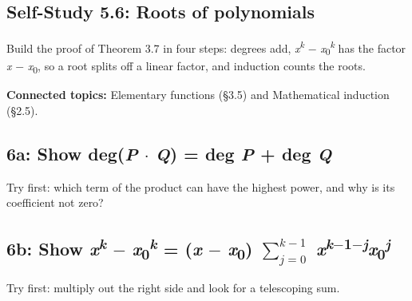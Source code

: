 \documentclass[11pt]{article}
\begin{document}
\begin{keepsection}
\section{Self-Study 5.6: Roots of polynomials}

Build the proof of Theorem 3.7 in four steps: degrees add, \textit{x}\textsuperscript{\textit{k}} \ensuremath{-} \textit{x}\textsubscript{0}\textsuperscript{\textit{k}} has the factor \textit{x} \ensuremath{-} \textit{x}\textsubscript{0}, so a root splits off a linear factor, and induction counts the roots.

\textbf{Connected topics:} Elementary functions (§3.5) and Mathematical induction (§2.5).

\begin{keepsection}
\subsection{6a: Show deg(\textit{P} \ensuremath{\cdot} \textit{Q}) = deg \textit{P} + deg \textit{Q}}

Try first: which term of the product can have the highest power, and why is its coefficient not zero?

\end{keepsection}

\begin{keepsection}
\subsection{6b: Show \textit{x}\textsuperscript{\textit{k}} \ensuremath{-} \textit{x}\textsubscript{0}\textsuperscript{\textit{k}} = (\textit{x} \ensuremath{-} \textit{x}\textsubscript{0}) $\sum_{{j}=0}^{{k}-1} $ \textit{x}\textsuperscript{\textit{k}\ensuremath{-}1\ensuremath{-}\textit{j}}\textit{x}\textsubscript{0}\textsuperscript{\textit{j}}}

Try first: multiply out the right side and look for a telescoping sum.

\end{keepsection}

\begin{keepsection}

\end{keepsection}
\end{keepsection}
\end{document}
